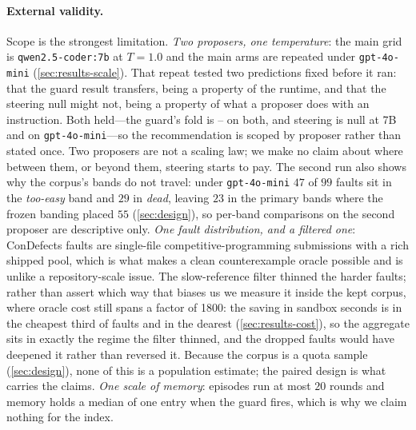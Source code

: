 \paragraph{External validity.}
Scope is the strongest limitation. \emph{Two proposers, one temperature}: the
main grid is \texttt{qwen2.5-coder:7b} at $T = 1.0$ and the main arms are
repeated under \texttt{gpt-4o-mini} (\cref{sec:results-scale}). That repeat
tested two predictions fixed before it ran: that the guard result transfers,
being a property of the runtime, and that the steering null might not, being a
property of what a proposer does with an instruction. Both held---the guard's
fold is -- on both, and steering is null at 7B and
 on \texttt{gpt-4o-mini}---so the recommendation is scoped by proposer
rather than stated once. Two proposers are not a scaling law; we make no claim
about where between them, or beyond them, steering starts to pay. The second
run also shows why the corpus's bands do not travel: under \texttt{gpt-4o-mini}
$47$ of $99$ faults sit in the \emph{too-easy} band and $29$ in \emph{dead},
leaving $23$ in the primary bands where the frozen banding placed $55$
(\cref{sec:design}), so per-band comparisons on the second proposer are
descriptive only. \emph{One fault distribution, and a filtered one}:
ConDefects faults are single-file competitive-programming submissions with a
rich shipped pool, which is what makes a clean counterexample oracle possible
and is unlike a repository-scale issue. The slow-reference filter thinned the
harder faults; rather than assert which way that biases us we measure it inside
the kept corpus, where oracle cost still spans a factor of \num{1800}: the
saving in sandbox seconds is  in the cheapest third of faults and
 in the dearest (\cref{sec:results-cost}), so the aggregate sits in
exactly the regime the filter thinned, and the dropped faults would have
deepened it rather than reversed it. Because the corpus is a quota sample (\cref{sec:design}), none of
this is a population estimate; the paired design is what carries the claims. \emph{One scale of memory}: episodes run at most $20$ rounds and
memory holds a median of one entry when the guard fires, which is why we claim
nothing for the index.

